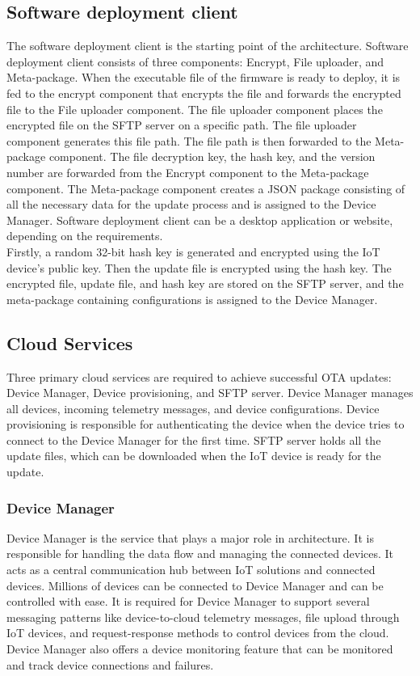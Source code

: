 \documentclass[12pt,a4paper]{article}
\begin{document}
{\subsection{Software deployment client}

The software deployment client is the starting point of the architecture. Software deployment client consists of three components: Encrypt, File uploader, and Meta-package. When the executable file of the firmware is ready to deploy, it is fed to the encrypt component that encrypts the file and forwards the encrypted file to the File uploader component. The file uploader component places the encrypted file on the SFTP server on a specific path. The file uploader component generates this file path. The file path is then forwarded to the Meta-package component. The file decryption key, the hash key, and the version number are forwarded from the Encrypt component to the Meta-package component. The Meta-package component creates a JSON package consisting of all the necessary data for the update process and is assigned to the Device Manager. Software deployment client can be a desktop application or website, depending on the requirements. \\

Firstly, a random 32-bit hash key is generated and encrypted using the IoT device's public key. Then the update file is encrypted using the hash key. The encrypted file, update file, and hash key are stored on the SFTP server, and the meta-package containing configurations is assigned to the Device Manager.

\subsection{Cloud Services}

Three primary cloud services are required to achieve successful OTA updates: Device Manager, Device provisioning, and SFTP server. Device Manager manages all devices, incoming telemetry messages, and device configurations. Device provisioning is responsible for authenticating the device when the device tries to connect to the Device Manager for the first time. SFTP server holds all the update files, which can be downloaded when the IoT device is ready for the update. 

\subsubsection{Device Manager}

Device Manager is the service that plays a major role in architecture. It is responsible for handling the data flow and managing the connected devices. It acts as a central communication hub between IoT solutions and connected devices. Millions of devices can be connected to Device Manager and can be controlled with ease. It is required for Device Manager to support several messaging patterns like device-to-cloud telemetry messages, file upload through IoT devices, and request-response methods to control devices from the cloud. Device Manager also offers a device monitoring feature that can be monitored and track device connections and failures. \cite{r36} \\

}
\end{document}
